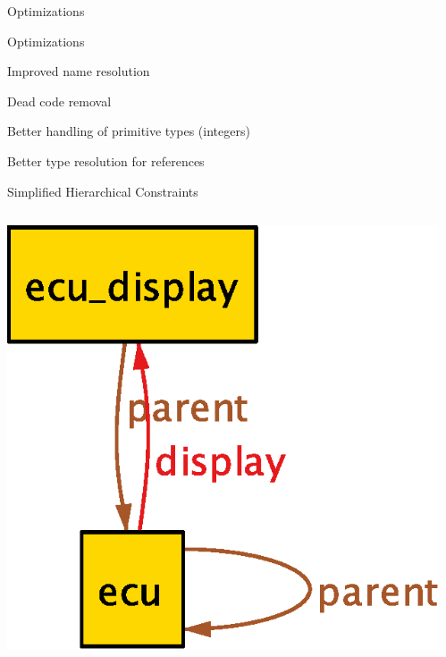 \documentclass[table,15pt,t]{beamer}
\newcommand{\vmiddle}[1]{
  \vspace{\stretch{1}}
  #1
  \vspace{\stretch{1}}
}
\newcommand{\interframe}[1]{
\begin{frame}{}
\vmiddle{\hmiddle{\Huge #1}}
\end{frame}
}
\newcommand{\mlist}[1]{
\vmiddle{
  \begin{list}{}{}
    #1
  \end{list}
  }
}
\newcommand{\hmiddle}[1]{
  \begin{center}#1\end{center}
}
\newcounter{i}
\begin{document}
\interframe{Optimizations}

\begin{frame}{Optimizations}
 \mlist{
    \item Improved name resolution
    \item Dead code removal
    \item Better handling of primitive types (integers)
    \item Better type resolution for references
 }
\end{frame}

\begin{frame}{Simplified Hierarchical Constraints}
  \begin{columns}
    \begin{column}{0.5\textwidth}
      \includegraphics[scale=0.5]{figs/parent-old}
    \end{column}
    \begin{column}{0.5\textwidth}

\end{column}
\end{columns}
\end{frame}
\end{document}
